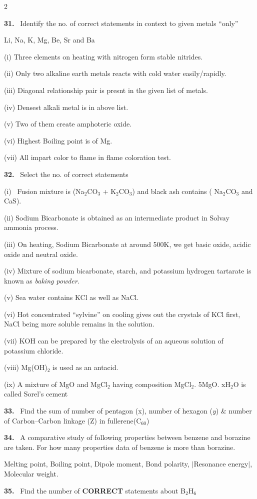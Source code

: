 \documentclass[10pt]{extarticle}
\newcommand{\qn}[1]{\par\smallskip\noindent\textbf{#1.}~}
\begin{document}
\begin{multicols}{2}
\qn{31} Identify the no. of correct statements in context to given metals ``only''\par
Li, Na, K, Mg, Be, Sr and Ba\par
(i) Three elements on heating with nitrogen form stable nitrides.\par
(ii) Only two alkaline earth metals reacts with cold water easily/rapidly.\par
(iii) Diagonal relationship pair is presnt in the given list of metals.\par
(iv) Densest alkali metal is in above list.\par
(v) Two of them create amphoteric oxide.\par
(vi) Highest Boiling point is of Mg.\par
(vii) All impart color to flame in flame coloration test.
\qn{32} Select the no. of correct statements\par
(i) \ Fusion mixture is (Na$_2$CO$_3$ + K$_2$CO$_3$) and black ash contains ( Na$_2$CO$_3$ and CaS).\par
(ii) Sodium Bicarbonate is obtained as an intermediate product in Solvay ammonia process.\par
(iii) On heating, Sodium Bicarbonate at around 500K, we get basic oxide, acidic oxide and neutral oxide.\par
(iv) Mixture of sodium bicarbonate, starch, and potassium hydrogen tartarate is known as \textit{baking powder}.\par
(v) Sea water contains KCl as well as NaCl.\par
(vi) Hot concentrated ``sylvine'' on cooling gives out the crystals of KCl first, NaCl being more soluble remains in the solution.\par
(vii) KOH can be prepared by the electrolysis of an aqueous solution of potassium chloride.\par
(viii) Mg(OH)$_2$ is used as an antacid.\par
(ix) A mixture of MgO and MgCl$_2$ having composition MgCl$_2$. 5MgO. xH$_2$O is called Sorel's cement
\qn{33} Find the sum of number of pentagon (x), number of hexagon (\textit{y}) \& number of Carbon--Carbon linkage (Z) in fullerene(C$_{60}$)
\qn{34} A comparative study of following properties between benzene and borazine are taken. For how many properties data of benzene is more than borazine.\par
Melting point, Boiling point, Dipole moment, Bond polarity, $|$Resonance energy$|$, Molecular weight.
\qn{35} Find the number of \textbf{CORRECT} statements about B$_2$H$_6$\par

\end{multicols}
\end{document}
